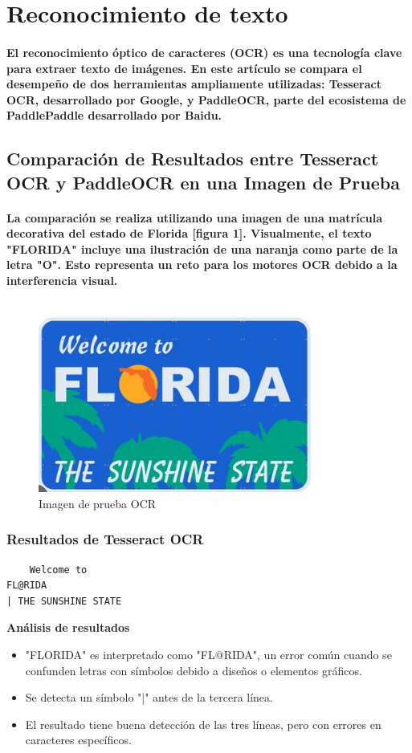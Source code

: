 \documentclass[conference]{IEEEtran}
\begin{document}
\section{Reconocimiento de texto}
\paragraph{El reconocimiento óptico de caracteres (OCR) es una tecnología clave para extraer texto de imágenes. En este artículo se compara el desempeño de dos herramientas ampliamente utilizadas: Tesseract OCR, desarrollado por Google, y PaddleOCR, parte del ecosistema de PaddlePaddle desarrollado por Baidu.}

\subsection{Comparación de Resultados entre Tesseract OCR y PaddleOCR en una Imagen de Prueba}

\paragraph{La comparación se realiza utilizando una imagen de una matrícula decorativa del estado de Florida [figura 1]. Visualmente, el texto "FLORIDA" incluye una ilustración de una naranja como parte de la letra "O". Esto representa un reto para los motores OCR debido a la interferencia visual.
}
\begin{figure}
    \centering
    \includegraphics[width=0.5\linewidth]{resources/test.jpg}
    \caption{Imagen de prueba OCR}
    \label{fig:enter-label}
\end{figure}
\subsubsection{Resultados de Tesseract OCR}
\begin{verbatim}
    Welcome to
FL@RIDA
| THE SUNSHINE STATE
\end{verbatim}
\textbf{Análisis de resultados}
\begin{itemize}
    \item "FLORIDA" es interpretado como "FL@RIDA", un error común cuando se confunden letras con símbolos debido a diseños o elementos gráficos.
    \item Se detecta un símbolo "|" antes de la tercera línea.
    \item El resultado tiene buena detección de las tres líneas, pero con errores en caracteres específicos.
\end{itemize}
\end{document}
